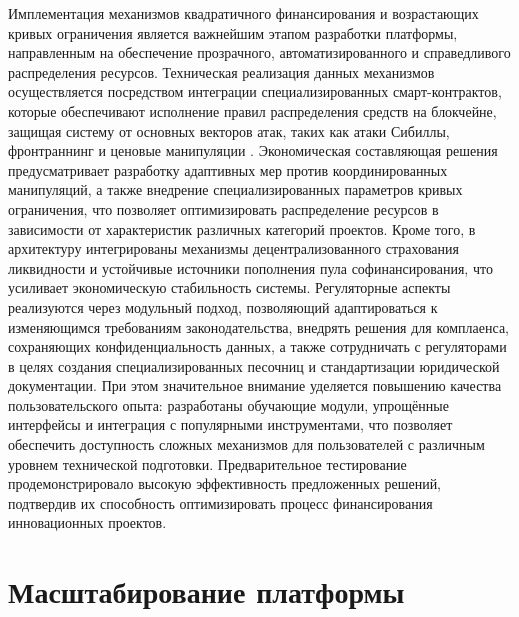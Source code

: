 \documentclass[
    candidate, %
    subf, %
    dotsinheaders=false,
]{disser}
\begin{document}
Имплементация механизмов квадратичного финансирования и возрастающих кривых ограничения является важнейшим этапом разработки платформы, направленным на обеспечение прозрачного, автоматизированного и справедливого распределения ресурсов. Техническая реализация данных механизмов осуществляется посредством интеграции специализированных смарт-контрактов, которые обеспечивают исполнение правил распределения средств на блокчейне, защищая систему от основных векторов атак, таких как атаки Сибиллы, фронтраннинг и ценовые манипуляции \cite{bohme2015bitcoin}. Экономическая составляющая решения предусматривает разработку адаптивных мер против координированных манипуляций, а также внедрение специализированных параметров кривых ограничения, что позволяет оптимизировать распределение ресурсов в зависимости от характеристик различных категорий проектов. Кроме того, в архитектуру интегрированы механизмы децентрализованного страхования ликвидности и устойчивые источники пополнения пула софинансирования, что усиливает экономическую стабильность системы. Регуляторные аспекты реализуются через модульный подход, позволяющий адаптироваться к изменяющимся требованиям законодательства, внедрять решения для комплаенса, сохраняющих конфиденциальность данных, а также сотрудничать с регуляторами в целях создания специализированных песочниц и стандартизации юридической документации. При этом значительное внимание уделяется повышению качества пользовательского опыта: разработаны обучающие модули, упрощённые интерфейсы и интеграция с популярными инструментами, что позволяет обеспечить доступность сложных механизмов для пользователей с различным уровнем технической подготовки. Предварительное тестирование продемонстрировало высокую эффективность предложенных решений, подтвердив их способность оптимизировать процесс финансирования инновационных проектов.

\section{Масштабирование платформы}
\end{document}

